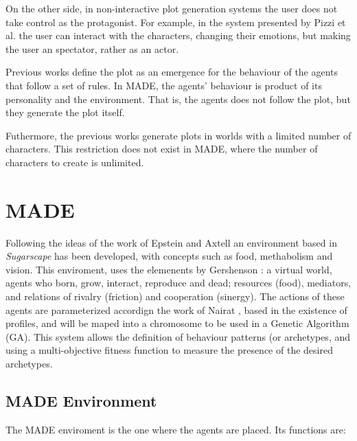 \documentclass[final,1p,times]{elsarticle}
\begin{document}
On the other side, in non-interactive plot generation systems the user does not take control as the protagonist. For example, in the system presented by Pizzi et al. \cite{pizzi2007interactive} the user can interact with the characters, changing their emotions, but making the user an spectator, rather as an actor. %

Previous works define the plot as an emergence for the behaviour of the agents that follow a set of rules. In MADE, the agents' behaviour is product of its personality and the environment. That is, the agents does not follow the plot, but they generate the plot itself. %

Futhermore, the previous works generate plots in worlds with a limited number of characters. This restriction does not exist in MADE, where the number of characters to create is unlimited.


\section{MADE}
\label{sec:made}

Following the ideas of the work of Epstein and Axtell \cite{epstein1996growing} an environment based in {\em Sugarscape} has been developed, with concepts such as food, methabolism and vision. This enviroment, uses the elemenents  by Gershenson \cite{gershenson2005general}: a virtual world, agents who born, grow, interact, reproduce and dead; resources (food), mediators, and relations of rivalry (friction) and cooperation (sinergy). The actions of these agents are parameterized accordign the work of Nairat \cite{nairat2011character}, based in the existence of profiles, and will be maped into a chromosome to be used in a Genetic Algorithm (GA). This system allows the definition of behaviour patterns (or archetypes, and using a multi-objective fitness function to measure the presence of the desired archetypes. %


\subsection{MADE Environment}
The MADE enviroment is the one where the agents are placed. Its functions are:
\end{document}
